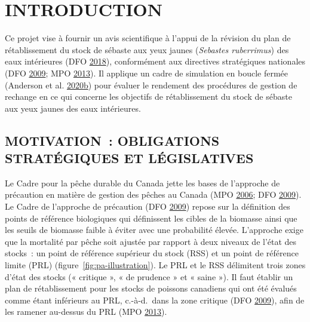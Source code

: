 \documentclass[french,11pt]{book}
\begin{document}
\renewcommand{\tablename}{Tableau}
\frontmatter

\clearpage

\hypertarget{sec:introduction}{%
\section{INTRODUCTION}\label{sec:introduction}}

Ce projet vise à fournir un avis scientifique à l'appui de la révision du plan de rétablissement du stock de sébaste aux yeux jaunes (\emph{Sebastes ruberrimus}) des eaux intérieures (DFO \protect\hyperlink{ref-ifmp2018}{2018}), conformément aux directives stratégiques nationales (DFO \protect\hyperlink{ref-dfo2009}{2009}; MPO \protect\hyperlink{ref-dfo2013}{2013}). Il applique un cadre de simulation en boucle fermée (Anderson et al. \protect\hyperlink{ref-anderson2020gfmp}{2020}\protect\hyperlink{ref-anderson2020gfmp}{b}) pour évaluer le rendement des procédures de gestion de rechange en ce qui concerne les objectifs de rétablissement du stock de sébaste aux yeux jaunes des eaux intérieures.

\hypertarget{sec:introduction-motivation}{%
\subsection{MOTIVATION~: OBLIGATIONS STRATÉGIQUES ET LÉGISLATIVES}\label{sec:introduction-motivation}}

Le Cadre pour la pêche durable du Canada jette les bases de l'approche de précaution en matière de gestion des pêches au Canada (MPO \protect\hyperlink{ref-dfo2006}{2006}; DFO \protect\hyperlink{ref-dfo2009}{2009}). Le Cadre de l'approche de précaution (DFO \protect\hyperlink{ref-dfo2009}{2009}) repose sur la définition des points de référence biologiques qui définissent les cibles de la biomasse ainsi que les seuils de biomasse faible à éviter avec une probabilité élevée. L'approche exige que la mortalité par pêche soit ajustée par rapport à deux niveaux de l'état des stocks~: un point de référence supérieur du stock (RSS) et un point de référence limite (PRL) (figure~\ref{fig:pa-illustration}). Le PRL et le RSS délimitent trois zones d'état des stocks (« critique », « de prudence » et « saine »). Il faut établir un plan de rétablissement pour les stocks de poissons canadiens qui ont été évalués comme étant inférieurs au PRL, c.-à-d.~dans la zone critique (DFO \protect\hyperlink{ref-dfo2009}{2009}), afin de les ramener au-dessus du PRL (MPO \protect\hyperlink{ref-dfo2013}{2013}).
\end{document}

